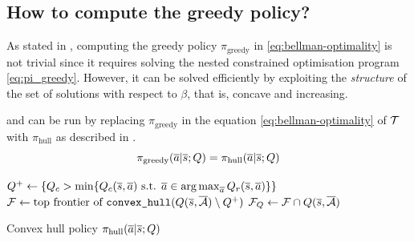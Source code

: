 \documentclass{article}
\begin{document}
\subsection{How to compute the greedy policy?}
\label{subsec:compute-greedy-policy}
As stated in , computing the greedy policy $\pi_\text{greedy}$ in \eqref{eq:bellman-optimality} is not trivial since it requires solving the nested constrained optimisation program \eqref{eq:pi_greedy}.
However, it can be solved efficiently by exploiting the \emph{structure} of the set of solutions with respect to $\beta$, that is, concave and increasing. 

\begin{proposition}
\label{prop:bftq_pi_hull}
 and  can be run by replacing $\pi_\text{greedy}$ in the equation \eqref{eq:bellman-optimality} of $\mathcal{T}$ with $\pi_\text{hull}$ as described in .
\begin{equation*}
    \pi_\text{greedy}(\overline{a}|\overline{s}; Q) = \pi_\text{hull}(\overline{a}|\overline{s}; Q)
\end{equation*}
\end{proposition}

\begin{algorithm}
\DontPrintSemicolon
{}
$Q^+\leftarrow \{Q_c > \min \{Q_c(\overline{s},\overline{a}) \text{ s.t. }\overline{a}\in\operatorname*{arg\,max}_{\overline{a}} Q_r(\overline{s},\overline{a})\} \}$\;
$\mathcal{F} \leftarrow \text{top frontier of }\texttt{convex\_hull}(Q(\overline{s},\overline{\mathcal{A}}) \setminus Q^+)$\;
$\mathcal{F}_Q \leftarrow \mathcal{F}\cap Q(\overline{s},\overline{\mathcal{A}})$\;
\caption{Convex hull policy $\pi_\text{hull}(\overline{a}|\overline{s}; Q)$}
\label{algo:pi_hull}
\end{algorithm}
\end{document}

